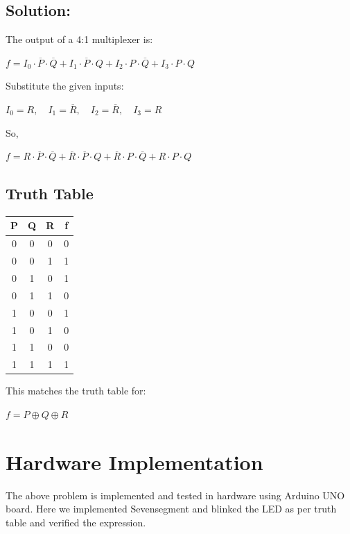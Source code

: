 \documentclass[a4paper,12pt]{article}
\begin{document}
\subsection*{Solution:}

The output of a 4:1 multiplexer is:

$
f = I_0 \cdot \overline{P} \cdot \overline{Q} + I_1 \cdot \overline{P} \cdot Q + I_2 \cdot P \cdot \overline{Q} + I_3 \cdot P \cdot Q
$

Substitute the given inputs:

$
I_0 = R,\quad I_1 = \overline{R},\quad I_2 = \overline{R},\quad I_3 = R
$

So,

$
f = R \cdot \overline{P} \cdot \overline{Q} + \overline{R} \cdot \overline{P} \cdot Q + \overline{R} \cdot P \cdot \overline{Q} + R \cdot P \cdot Q
$

\subsection*{Truth Table}

\begin{center}
\begin{tabular}{|c|c|c|c|}
\hline
P & Q & R & f \\
\hline
0 & 0 & 0 & 0 \\
0 & 0 & 1 & 1 \\
0 & 1 & 0 & 1 \\
0 & 1 & 1 & 0 \\
1 & 0 & 0 & 1 \\
1 & 0 & 1 & 0 \\
1 & 1 & 0 & 0 \\
1 & 1 & 1 & 1 \\
\hline
\end{tabular}
\end{center}

This matches the truth table for:

$
f = P \oplus Q \oplus R
$
\section*{\textbf{Hardware Implementation}}
The above problem is implemented and tested in hardware using Arduino UNO board. Here we implemented Sevensegment and blinked the LED as per truth table and verified the expression.
\end{document}
